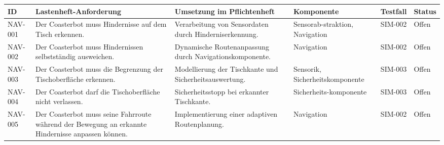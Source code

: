 \begin{longtable}[]{@{}
  >{\raggedright\arraybackslash}p{}
  >{\raggedright\arraybackslash}p{}
  >{\raggedright\arraybackslash}p{}
  >{\raggedright\arraybackslash}p{}
  >{\raggedleft\arraybackslash}p{}
  >{\raggedright\arraybackslash}p{}@{}}
\toprule\noalign{}
\begin{minipage}[b]{\linewidth}\raggedright
ID
\end{minipage} & \begin{minipage}[b]{\linewidth}\raggedright
Lastenheft-Anforderung
\end{minipage} & \begin{minipage}[b]{\linewidth}\raggedright
Umsetzung im Pflichtenheft
\end{minipage} & \begin{minipage}[b]{\linewidth}\raggedright
Komponente
\end{minipage} & \begin{minipage}[b]{\linewidth}\raggedleft
Testfall
\end{minipage} & \begin{minipage}[b]{\linewidth}\raggedright
Status
\end{minipage} \\
\midrule\noalign{}
\endhead
\bottomrule\noalign{}
\endlastfoot
NAV-001 & Der Coasterbot muss Hindernisse auf dem Tisch erkennen. &
Verarbeitung von Sensordaten durch Hinderniserkennung. &
Sensorab-straktion, Navigation & SIM-002 & Offen \\
NAV-002 & Der Coasterbot muss Hindernissen selbstständig ausweichen. &
Dynamische Routenanpassung durch Navigationskomponente. & Navigation &
SIM-002 & Offen \\
NAV-003 & Der Coasterbot muss die Begrenzung der Tischoberfläche
erkennen. & Modellierung der Tischkante und Sicherheitsauswertung. &
Sensorik, Sicherheitskomponente & SIM-003 & Offen \\
NAV-004 & Der Coasterbot darf die Tischoberfläche nicht verlassen. &
Sicherheitsstopp bei erkannter Tischkante. & Sicherheits-komponente &
SIM-003 & Offen \\
NAV-005 & Der Coasterbot muss seine Fahrroute während der Bewegung an
erkannte Hindernisse anpassen können. & Implementierung einer adaptiven
Routenplanung. & Navigation & SIM-002 & Offen \\

\end{longtable}
